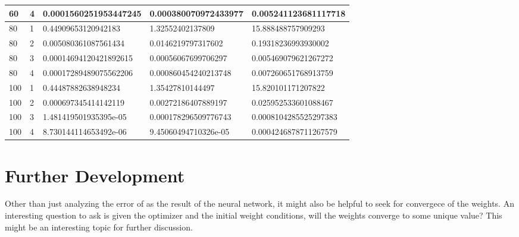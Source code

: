 \documentclass[a4paper, 12pt]{report}
\def\tabsize{4.4cm}
\def\stabsize{1.1cm}
\begin{document}
\begin{center}
\begin{tabular}{|m{\stabsize}|m{\stabsize}|m{\tabsize}|m{\tabsize}|m{\tabsize}|}
60& 4& 0.0001560251953447245& 0.000380070972433977& 0.005241123681117718 \\ \hline
80& 1& 0.44909653120942183& 1.32552402137809& 15.888488757909293 \\ \hline
80& 2& 0.005080361087561434& 0.0146219797317602& 0.19318236993930002 \\ \hline
80& 3& 0.00014694120421892615& 0.00056067699706297& 0.005469079621267272 \\ \hline
80& 4& 0.00017289489075562206& 0.000860454240213748& 0.007260651768913759 \\ \hline
100& 1& 0.44487882638948234& 1.35427810144497& 15.820101171207822 \\ \hline
100& 2& 0.000697345414142119& 0.00272186407889197& 0.025952533601088467 \\ \hline
100& 3& 1.481419501935395e-05& 0.000178296509776743& 0.0008104285525297383 \\ \hline
100& 4& 8.730144114653492e-06 &9.45060494710326e-05 &0.0004246878711267579 \\ \hline
\end{tabular}
\section{Further Development}
\begin{comment}
\end{comment}
Other than just analyzing the error of as the result of the neural network, it might also be helpful to seek for convergece of the weights. An interesting question to ask is given the optimizer and the initial weight conditions, will the weights converge to some unique value? This might be an interesting topic for further discussion.
\end{center}
\end{document}
